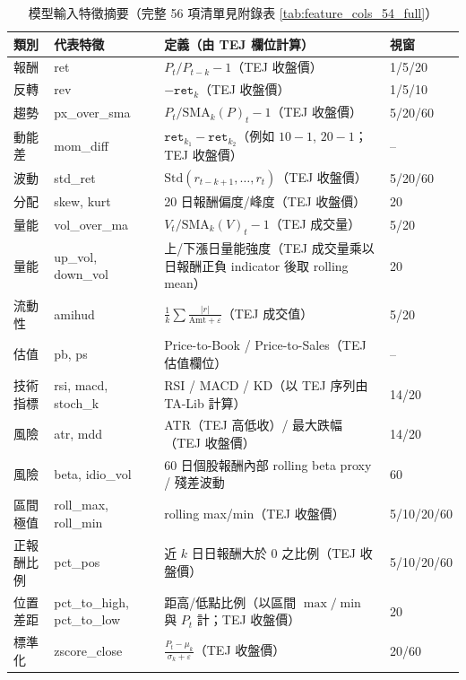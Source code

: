 \renewcommand{\arraystretch}{1.15}
\begin{table}[H]
\centering
\caption{模型輸入特徵摘要（完整 56 項清單見附錄表 \ref{tab:feature_cols_54_full}）}
\label{tab:feature_cols_54}
\begin{tabular}{p{3.1cm} p{3.0cm} p{6.8cm} p{1.6cm}}
\toprule
\textbf{類別} & \textbf{代表特徵} & \textbf{定義（由 TEJ 欄位計算）} & \textbf{視窗} \\
\midrule
報酬 & ret & $P_t/P_{t-k}-1$（TEJ 收盤價） & 1/5/20 \\
反轉 & rev & $-\texttt{ret}_k$（TEJ 收盤價） & 1/5/10 \\
趨勢 & px\_over\_sma & $P_t/\text{SMA}_k(P)_t-1$（TEJ 收盤價） & 5/20/60 \\
動能差 & mom\_diff & $\texttt{ret}_{k_1}-\texttt{ret}_{k_2}$（例如 $10-1$, $20-1$；TEJ 收盤價） & -- \\
波動 & std\_ret & $\text{Std}(r_{t-k+1},\ldots,r_t)$（TEJ 收盤價） & 5/20/60 \\
分配 & skew, kurt & 20 日報酬偏度/峰度（TEJ 收盤價） & 20 \\
量能 & vol\_over\_ma & $V_t/\text{SMA}_k(V)_t-1$（TEJ 成交量） & 5/20 \\
量能 & up\_vol, down\_vol & 上/下漲日量能強度（TEJ 成交量乘以日報酬正負 indicator 後取 rolling mean） & 20 \\
流動性 & amihud & $\frac{1}{k}\sum \frac{|r|}{\text{Amt}+\varepsilon}$（TEJ 成交值） & 5/20 \\
估值 & pb, ps & Price-to-Book / Price-to-Sales（TEJ 估值欄位） & -- \\
技術指標 & rsi, macd, stoch\_k & RSI / MACD / KD（以 TEJ 序列由 TA-Lib 計算） & 14/20 \\
風險 & atr, mdd & ATR（TEJ 高低收）/ 最大跌幅（TEJ 收盤價） & 14/20 \\
風險 & beta, idio\_vol & 60 日個股報酬內部 rolling beta proxy / 殘差波動 & 60 \\
區間極值 & roll\_max, roll\_min & rolling max/min（TEJ 收盤價） & 5/10/20/60 \\
正報酬比例 & pct\_pos & 近 $k$ 日日報酬大於 0 之比例（TEJ 收盤價） & 5/10/20/60 \\
位置差距 & pct\_to\_high, pct\_to\_low & 距高/低點比例（以區間 $\max/\min$ 與 $P_t$ 計；TEJ 收盤價） & 20 \\
標準化 & zscore\_close & $\frac{P_t-\mu_k}{\sigma_k+\varepsilon}$（TEJ 收盤價） & 20/60 \\
\bottomrule
\end{tabular}
\end{table}
\renewcommand{\arraystretch}{1.0}

